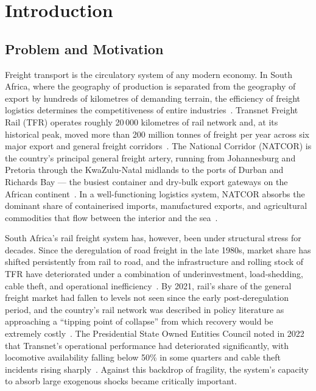 
\section{Introduction}
\label{sec:introduction}

\subsection{Problem and Motivation}
\label{sec:prob}

Freight transport is the circulatory system of any modern economy.
In South Africa, where the geography of production is separated from
the geography of export by hundreds of kilometres of demanding
terrain, the efficiency of freight logistics determines the
competitiveness of entire industries~\parencite{worldbank2023lpi}.
Transnet Freight Rail (TFR) operates roughly 20\,000 kilometres of
rail network and, at its historical peak, moved more than 200 million
tonnes of freight per year across six major export and general freight
corridors~\parencite{havenga2021}.
The National Corridor (NATCOR) is the country's principal general
freight artery, running from Johannesburg and Pretoria through the
KwaZulu-Natal midlands to the ports of Durban and Richards Bay ---
the busiest container and dry-bulk export gateways on the African
continent~\parencite{dpme2022}.
In a well-functioning logistics system, NATCOR absorbs the dominant
share of containerised imports, manufactured exports, and agricultural
commodities that flow between the interior and the sea~\parencite{havenga2021}.

South Africa's rail freight system has, however, been under
structural stress for decades.
Since the deregulation of road freight in the late 1980s, market
share has shifted persistently from rail to road, and the
infrastructure and rolling stock of TFR have deteriorated under a
combination of underinvestment, load-shedding, cable theft, and
operational inefficiency~\parencite{stander2005, havenga2021}.
By 2021, rail's share of the general freight market had fallen to
levels not seen since the early post-deregulation period, and the
country's rail network was described in policy literature as
approaching a ``tipping point of collapse'' from which recovery would
be extremely costly~\parencite{havenga2021}.
The Presidential State Owned Entities Council noted in 2022 that
Transnet's operational performance had deteriorated significantly,
with locomotive availability falling below 50\% in some quarters
and cable theft incidents rising sharply~\parencite{transnet2023ar}.
Against this backdrop of fragility, the system's capacity to absorb
large exogenous shocks became critically important.

